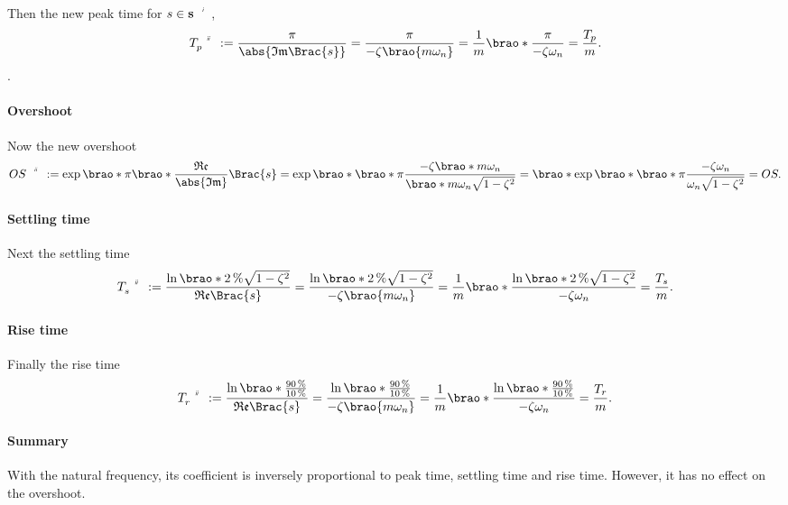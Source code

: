 \documentclass[11pt]{article}
\begin{document}
\begin{adjustwidth}{0.5in}{0in}
        Then the new peak time for \(s \in \setprime{\mathbf{s}}\),
        \[
            \setprime[2]{T}_p
            := \frac\pi{\abs{\mathfrak{Im}\Brac{s}}}
            = \frac\pi{-\zeta\brao{m\omega_n}}
            = \frac1m \brao*{\frac\pi{-\zeta\omega_n}}
            = \frac{T_p}m.
        \].

        \paragraph{Overshoot}
        Now the new overshoot
        \[
                \setprime[2]{OS}
                := \exp\brao*{\pi\brao*{\frac{\mathfrak{Re}}{\abs{\mathfrak{Im}}}}\Brac{s}}
                = \exp\brao*{\brao*\pi\frac
                    {-\zeta\brao*{m\omega_n}}
                    {\brao*{m\omega_n} \sqrt{1 - \zeta^2}}
                }
                = \brao*{\exp\brao*{\brao*\pi\frac
                    {-\zeta\omega_n}
                    {\omega_n \sqrt{1 - \zeta^2}}
                }}
                = OS.
        \]

        \paragraph{Settling time}
        Next the settling time
        \[
            \setprime[2]{T}_s
            := \frac{\ln\brao*{\SI2\percent \sqrt{1 - \zeta^2}}}{\mathfrak{Re}\Brac{s}}
            = \frac{\ln\brao*{\SI2\percent \sqrt{1 - \zeta^2}}}{-\zeta\brao{m\omega_n}}
            = \frac1m\brao*{\frac{\ln\brao*{\SI2\percent \sqrt{1 - \zeta^2}}}{-\zeta\omega_n}}
            = \frac{T_s}m.
        \]

        \paragraph{Rise time}
        Finally the rise time
        \[
            \setprime[2]T_r
            := \frac{\ln\brao*{\frac
                {\SI{90}\percent}
                {\SI{10}\percent}
            }}{\mathfrak{Re}\Brac{s}}
            = \frac{\ln\brao*{\frac
                {\SI{90}\percent}
                {\SI{10}\percent}
            }}{-\zeta\brao{m\omega_n}}
            = \frac1m\brao*{
                \frac{\ln\brao*{\frac
                    {\SI{90}\percent}
                    {\SI{10}\percent}
                }}{-\zeta\omega_n}
            }
            = \frac{T_r}m.
        \]

        \paragraph{Summary}
        With the natural frequency, its coefficient is inversely proportional to peak time, settling time and rise time. However, it has no effect on the overshoot.


\end{adjustwidth}
\end{document}
